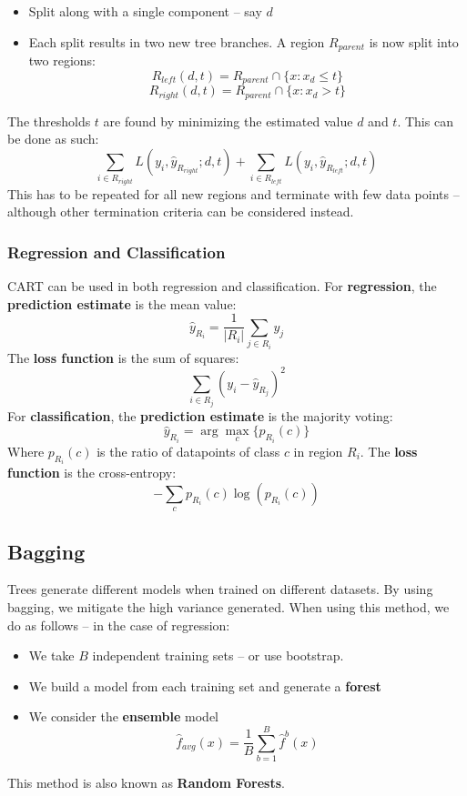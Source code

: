 \documentclass{article}
\begin{document}
\begin{itemize}
	\item Split along with a single component -- say $d$
	\item Each split results in two new tree branches. A region $R_{parent}$ is now split into two regions:
	\[ R_{left}(d, t) = R_{parent} \cap \{ x : x_d \leq t \} \]
	\[ R_{right}(d, t) = R_{parent} \cap \{ x : x_d > t \} \]
\end{itemize}
The thresholds $t$ are found by minimizing the estimated value $d$ and $t$. This can be done as such:
\[ \sum_{i \in R_{right}} L(y_i, \hat y_{R_{right}}; d, t) + \sum_{i \in R_{left}} L(y_i, \hat y_{R_{left}}; d, t) \]
This has to be repeated for all new regions and terminate with few data points -- although other termination criteria can be considered instead.

\subsubsection{Regression and Classification}
CART can be used in both regression and classification. For \textbf{regression}, the \textbf{prediction estimate} is the mean value:
\[ \hat y_{R_i} = \frac{1}{|R_i|} \sum _{j \in R_i} y_j \]
The \textbf{loss function} is the sum of squares:
\[ \displaystyle\sum_{i \in R_j}(y_i - \hat y_{R_j})^2 \]
For \textbf{classification}, the \textbf{prediction estimate} is the majority voting:
\[ \hat y_{R_i} = \displaystyle\arg\max_c\{ p_{R_i}(c) \} \]
Where $p_{R_i}(c)$ is the ratio of datapoints of class $c$ in region $R_i$. The \textbf{loss function} is the cross-entropy:
\[ - \sum_c p_{R_i}(c) \log(p_{R_i}(c)) \]

\subsection{Bagging}
Trees generate different models when trained on different datasets. By using bagging, we mitigate the high variance generated. When using this method, we do as follows -- in the case of regression:

\begin{itemize}
	\item We take $B$ independent training sets -- or use bootstrap.
	\item We build a model from each training set and generate a \textbf{forest}
	\item We consider the \textbf{ensemble} model
	\[ \hat f_{avg}(x) = \frac{1}{B}\sum^B_{b=1} \hat f^b(x) \]
\end{itemize}
This method is also known as \textbf{Random Forests}.
\end{document}
